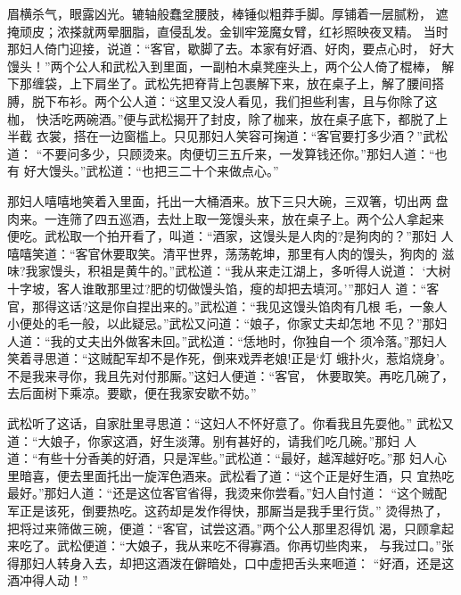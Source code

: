 眉横杀气，眼露凶光。辘轴般蠢坌腰肢，棒锤似粗莽手脚。厚铺着一层腻粉，
遮掩顽皮；浓搽就两晕胭脂，直侵乱发。金钏牢笼魔女臂，红衫照映夜叉精。
当时那妇人倚门迎接，说道：“客官，歇脚了去。本家有好酒、好肉，要点心时，
好大馒头！”两个公人和武松入到里面，一副柏木桌凳座头上，两个公人倚了棍棒，
解下那缠袋，上下肩坐了。武松先把脊背上包裹解下来，放在桌子上，解了腰间搭
膊，脱下布衫。两个公人道：“这里又没人看见，我们担些利害，且与你除了这枷，
快活吃两碗酒。”便与武松揭开了封皮，除了枷来，放在桌子底下，都脱了上半截
衣裳，搭在一边窗槛上。只见那妇人笑容可掬道：“客官要打多少酒？”武松道：
“不要问多少，只顾烫来。肉便切三五斤来，一发算钱还你。”那妇人道：“也有
好大馒头。”武松道：“也把三二十个来做点心。”

那妇人嘻嘻地笑着入里面，托出一大桶酒来。放下三只大碗，三双箸，切出两
盘肉来。一连筛了四五巡酒，去灶上取一笼馒头来，放在桌子上。两个公人拿起来
便吃。武松取一个拍开看了，叫道：“酒家，这馒头是人肉的?是狗肉的？”那妇
人嘻嘻笑道：“客官休要取笑。清平世界，荡荡乾坤，那里有人肉的馒头，狗肉的
滋味?我家馒头，积祖是黄牛的。”武松道：“我从来走江湖上，多听得人说道：
‘大树十字坡，客人谁敢那里过?肥的切做馒头馅，瘦的却把去填河。’”那妇人
道：“客官，那得这话?这是你自捏出来的。”武松道：“我见这馒头馅肉有几根
毛，一象人小便处的毛一般，以此疑忌。”武松又问道：“娘子，你家丈夫却怎地
不见？”那妇人道：“我的丈夫出外做客未回。”武松道：“恁地时，你独自一个
须冷落。”那妇人笑着寻思道：“这贼配军却不是作死，倒来戏弄老娘!正是‘灯
蛾扑火，惹焰烧身’。不是我来寻你，我且先对付那厮。”这妇人便道：“客官，
休要取笑。再吃几碗了，去后面树下乘凉。要歇，便在我家安歇不妨。”

武松听了这话，自家肚里寻思道：“这妇人不怀好意了。你看我且先耍他。”
武松又道：“大娘子，你家这酒，好生淡薄。别有甚好的，请我们吃几碗。”那妇
人道：“有些十分香美的好酒，只是浑些。”武松道：“最好，越浑越好吃。”那
妇人心里暗喜，便去里面托出一旋浑色酒来。武松看了道：“这个正是好生酒，只
宜热吃最好。”那妇人道：“还是这位客官省得，我烫来你尝看。”妇人自忖道：
“这个贼配军正是该死，倒要热吃。这药却是发作得快，那厮当是我手里行货。”
烫得热了，把将过来筛做三碗，便道：“客官，试尝这酒。”两个公人那里忍得饥
渴，只顾拿起来吃了。武松便道：“大娘子，我从来吃不得寡酒。你再切些肉来，
与我过口。”张得那妇人转身入去，却把这酒泼在僻暗处，口中虚把舌头来咂道：
“好酒，还是这酒冲得人动！”

